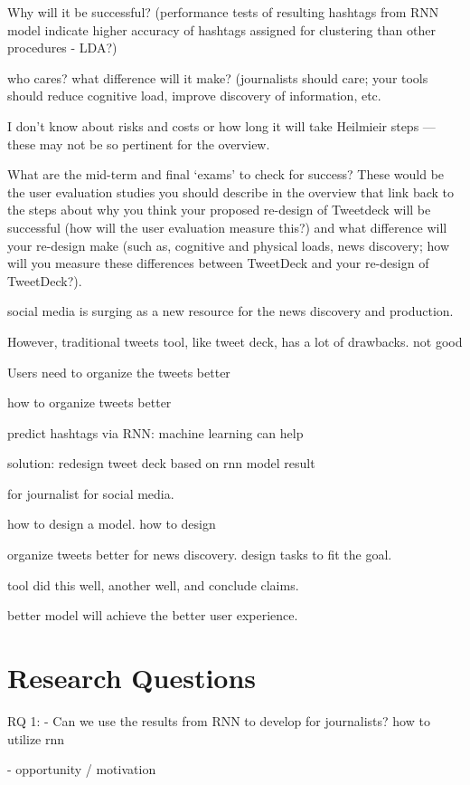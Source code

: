 Why will it be successful? (performance tests of resulting hashtags from RNN model indicate higher accuracy of hashtags assigned for clustering than other procedures - LDA?)

who cares? what difference will it make?  (journalists should care; your tools should reduce cognitive load, improve discovery of information, etc.

I don’t know about risks and costs or how long it will take Heilmieir steps — these may not be so pertinent for the overview.

What are the mid-term and final ‘exams' to check for success?  These would be the user evaluation studies you should describe in the overview that link back to the steps about why you think your proposed re-design of Tweetdeck will be successful (how will the user evaluation measure this?) and what difference will your re-design make (such as, cognitive and physical loads, news discovery; how will you measure these differences between TweetDeck and your re-design of TweetDeck?).



social media is surging as a new resource for the news discovery and production. 

However, traditional tweets tool, like tweet deck, has a lot of drawbacks.  not good

Users need to organize the tweets better

how to organize tweets better

predict hashtags via RNN: machine learning can help

solution: redesign tweet deck based on rnn model result

for journalist for social media. 

how to design a model. how to design 



organize tweets better for news discovery. design tasks to fit the goal. 

tool did this well, another well, and conclude claims. 


better model will achieve the better user experience.  


\section{Research Questions}

RQ 1:
- Can we use the results from RNN to develop for journalists? 
how to utilize rnn 


- opportunity / motivation

